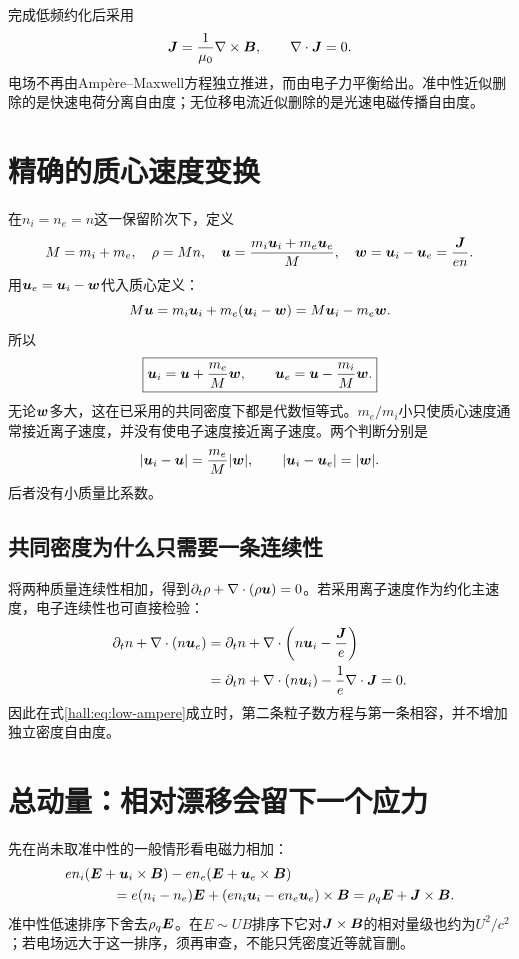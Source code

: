 完成低频约化后采用
\begin{equation}
\bm{J}=\frac1{\mu_0}\nabla\times\bm{B},\qquad\nabla\cdot\bm{J}=0.
\label{hall:eq:low-ampere}
\end{equation}
电场不再由Ampère--Maxwell方程独立推进，而由电子力平衡给出。准中性近似删除的是快速电荷分离自由度；无位移电流近似删除的是光速电磁传播自由度。

\section{精确的质心速度变换}
在$n_i=n_e=n$这一保留阶次下，定义
\begin{equation}
M=m_i+m_e,\quad \rho=Mn,\quad
\bm{u}=\frac{m_i\bm{u}_i+m_e\bm{u}_e}{M},\quad
\bm{w}=\bm{u}_i-\bm{u}_e=\frac{\bm{J}}{en}.
\end{equation}
用$\bm{u}_e=\bm{u}_i-\bm{w}$代入质心定义：
\begin{equation}
M\bm{u}=m_i\bm{u}_i+m_e(\bm{u}_i-\bm{w})
=M\bm{u}_i-m_e\bm{w}.
\end{equation}
所以
\begin{equation}
\boxed{\bm{u}_i=\bm{u}+\frac{m_e}{M}\bm{w},\qquad
\bm{u}_e=\bm{u}-\frac{m_i}{M}\bm{w}.}
\label{hall:eq:velocity-transform}
\end{equation}
无论$\bm{w}$多大，这在已采用的共同密度下都是代数恒等式。$m_e/m_i$小只使质心速度通常接近离子速度，并没有使电子速度接近离子速度。两个判断分别是
\begin{equation}
|\bm{u}_i-\bm{u}|=\frac{m_e}{M}|\bm{w}|,
\qquad |\bm{u}_i-\bm{u}_e|=|\bm{w}|.
\end{equation}
后者没有小质量比系数。

\subsection{共同密度为什么只需要一条连续性}
将两种质量连续性相加，得到$\partial_t\rho+\nabla\cdot(\rho\bm{u})=0$。若采用离子速度作为约化主速度，电子连续性也可直接检验：
\begin{align}
\partial_tn+\nabla\cdot(n\bm{u}_e)
&=\partial_tn+\nabla\cdot\left(n\bm{u}_i-\frac{\bm{J}}{e}\right)\\
&=\partial_tn+\nabla\cdot(n\bm{u}_i)-\frac1e\nabla\cdot\bm{J}=0.
\end{align}
因此在式\eqref{hall:eq:low-ampere}成立时，第二条粒子数方程与第一条相容，并不增加独立密度自由度。

\section{总动量：相对漂移会留下一个应力}
先在尚未取准中性的一般情形看电磁力相加：
\begin{align}
&en_i(\E+\vct u_i\times\B)-en_e(\E+\vct u_e\times\B)\\
&\hspace{12mm}=e(n_i-n_e)\E+
(en_i\vct u_i-en_e\vct u_e)\times\B
=\rho_q\E+\J\times\B.
\end{align}
准中性低速排序下舍去$\rho_q\bm{E}$。在$E\sim UB$排序下它对$\bm{J}\times\bm{B}$的相对量级也约为$U^2/c^2$；若电场远大于这一排序，须再审查，不能只凭密度近等就盲删。

